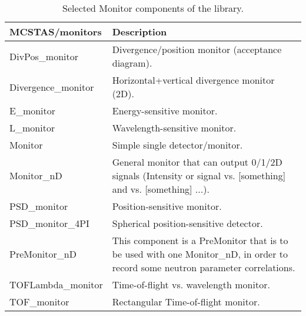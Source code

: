 \begin{table}
  \begin{center}
    {\let\my=\\
    \begin{tabular}{|p{}|p{}|}
      \hline
       \textbf{MCSTAS/monitors} & Description \\
       \hline
DivPos\_monitor  &    Divergence/position monitor (acceptance diagram). \\
Divergence\_monitor &  Horizontal+vertical
                    divergence monitor (2D). \\
E\_monitor       &    Energy-sensitive monitor. \\
L\_monitor        &  Wavelength-sensitive monitor. \\
Monitor          &   Simple single detector/monitor. \\
Monitor\_nD      &   General monitor that can output
                    0/1/2D signals (Intensity or signal vs. [something]
                    and vs. [something] ...). \\
PSD\_monitor     &    Position-sensitive monitor. \\
PSD\_monitor\_4PI  &   Spherical position-sensitive detector. \\
PreMonitor\_nD    &   This component is a PreMonitor that is to be
                    used with one Monitor\_nD,
                    in order to record some neutron parameter correlations. \\
TOFLambda\_monitor &  Time-of-flight vs. wavelength monitor. \\
TOF\_monitor     &    Rectangular Time-of-flight monitor. \\
      \hline
    \end{tabular}
    \caption{Selected Monitor components of the \MCS library.}
    \label{t:comp-monitors}
    }
  \end{center}
\end{table}

